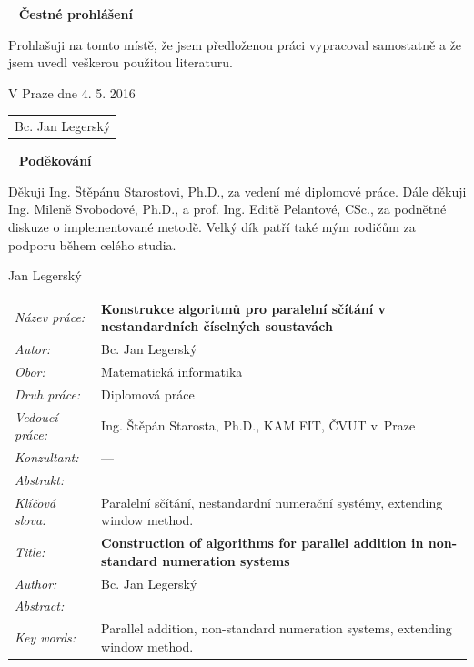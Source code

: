 \documentclass[a4paper, 11pt]{report}
\theoremstyle{definition}
\newcommand{\obor}{Matematická informatika}
\newcommand{\nazevcz}{Konstrukce algoritm\r u pro paraleln\'i s\v c\'it\'an\'i  v nestandardn\'ich \v c\'iseln\'ych soustav\'ach}
\newcommand{\nazeven}{Construction of algorithms for parallel addition   in non-standard numeration systems}
\newcommand{\autor}{Bc. Jan Legersk\'y}
\newcommand{\vedouci}{Ing. \v St\v ep\'an Starosta, Ph.D.}
\newcommand{\pracovisteVed}{KAM FIT, \v CVUT v~Praze}
\newcommand{\konzultant}{---}
\newcommand{\klicova}{Paraleln\'i s\v c\'it\'an\'i, nestandardn\'i numera\v cn\'i syst\'emy, extending window method.}  %
\newcommand{\keyword}{Parallel addition, non-standard numeration systems, extending window method.}
\newcommand{\abstrCZ}%
{%
}
\newcommand{\abstrEN}{
}
\begin{document}
\begin{titlepage}
% 


\thispagestyle{empty}
~
\vfill
\noindent\textbf{Čestné prohlášení}
\vspace{0.5cm}

Prohla\v suji na tomto m\'ist\v e, \v ze jsem p\v redlo\v zenou pr\'aci vypracoval samostatn\v e a \v ze jsem uvedl ve\v skerou pou\v zitou literaturu.
\vspace{1.5cm}

\noindent
\vspace{5mm}V Praze dne 4. 5. 2016\hfill
	\begin{tabular}{c}
	\\
	\autor
	\end{tabular}
\newpage


\thispagestyle{empty}
~
\vfill
\noindent\textbf{Pod\v ekov\'an\'i}
\vspace{0.5cm}

Děkuji Ing. Štěpánu Starostovi, Ph.D., za vedení mé diplomové práce. Dále děkuji Ing. Mileně Svobodové, Ph.D., a prof. Ing. Editě Pelantové, CSc., za  podnětné diskuze o implementované metodě. Velký dík patří také mým rodičům za podporu během celého studia.

\begin{flushright}
Jan Legersk\'y
\end{flushright}
\newpage


\thispagestyle{empty}

\begin{tabular}{lp{}}
  {\em N\'azev pr\'ace:} & \bf \nazevcz \\[4mm]
  {\em Autor:} & \autor \\[4mm]
  {\em Obor:} & \obor \\[4mm]
  {\em Druh pr\'ace:} & Diplomová práce \\[4mm]
  {\em Vedoucí práce:} & \vedouci, \pracovisteVed \\[4mm]
  {\em Konzultant:} & \konzultant \\[4mm]
  {\em Abstrakt:} & \abstrCZ \\[4mm]
  {\em Kl\'i\v cov\'a slova:} & \klicova \\[20mm]

  {\em Title:} & \bf \nazeven \\[4mm]
  {\em Author:} & \autor \\[4mm]
  {\em Abstract:} & \abstrEN \\[4mm]
  {\em Key words:} & \keyword
\end{tabular}
\newpage


\renewcommand\contentsname{\vspace{-3cm} Contents \vspace{-0.8cm}}
\tableofcontents
\thispagestyle{empty}

\end{titlepage}
\end{document}
